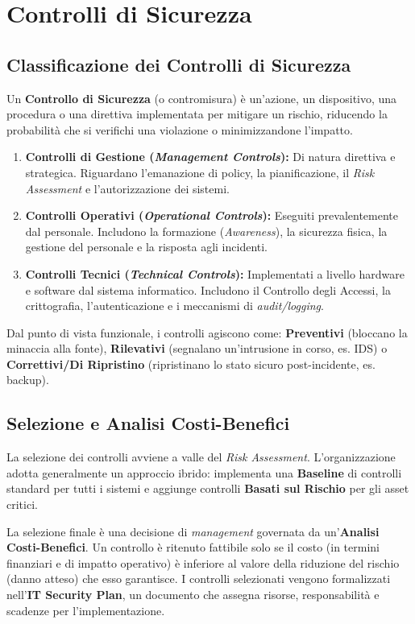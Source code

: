 \chapter{Controlli di Sicurezza}
\section{Classificazione dei Controlli di Sicurezza}
Un \textbf{Controllo di Sicurezza} (o contromisura) è un'azione, un dispositivo, una procedura o una direttiva implementata per mitigare un rischio, riducendo la probabilità che si verifichi una violazione o minimizzandone l'impatto.
\begin{enumerate}
    \item \textbf{Controlli di Gestione (\textit{Management Controls}):} Di natura direttiva e strategica. Riguardano l'emanazione di policy, la pianificazione, il \textit{Risk Assessment} e l'autorizzazione dei sistemi.
    \item \textbf{Controlli Operativi (\textit{Operational Controls}):} Eseguiti prevalentemente dal personale. Includono la formazione (\textit{Awareness}), la sicurezza fisica, la gestione del personale e la risposta agli incidenti.
    \item \textbf{Controlli Tecnici (\textit{Technical Controls}):} Implementati a livello hardware e software dal sistema informatico. Includono il Controllo degli Accessi, la crittografia, l'autenticazione e i meccanismi di \textit{audit/logging}.
\end{enumerate}

Dal punto di vista funzionale, i controlli agiscono come: \textbf{Preventivi} (bloccano la minaccia alla fonte), \textbf{Rilevativi} (segnalano un'intrusione in corso, es. IDS) o \textbf{Correttivi/Di Ripristino} (ripristinano lo stato sicuro post-incidente, es. backup).

\section{Selezione e Analisi Costi-Benefici}
La selezione dei controlli avviene a valle del \textit{Risk Assessment}. L'organizzazione adotta generalmente un approccio ibrido: implementa una \textbf{Baseline} di controlli standard per tutti i sistemi e aggiunge controlli \textbf{Basati sul Rischio} per gli asset critici.

La selezione finale è una decisione di \textit{management} governata da un'\textbf{Analisi Costi-Benefici}. Un controllo è ritenuto fattibile solo se il costo (in termini finanziari e di impatto operativo) è inferiore al valore della riduzione del rischio (danno atteso) che esso garantisce. I controlli selezionati vengono formalizzati nell'\textbf{IT Security Plan}, un documento che assegna risorse, responsabilità e scadenze per l'implementazione.

